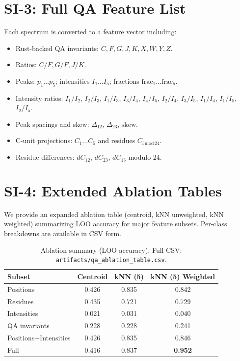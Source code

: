 \documentclass[12pt]{article}
\begin{document}
\section*{SI-3: Full QA Feature List}
Each spectrum is converted to a feature vector including:
\begin{itemize}
  \item Rust-backed QA invariants: $C,F,G,J,K,X,W,Y,Z$.
  \item Ratios: $C/F, G/F, J/K$.
  \item Peaks: $p_1\ldots p_5$; intensities $I_1\ldots I_5$; fractions $\mathrm{frac}_1\ldots\mathrm{frac}_5$.
  \item Intensity ratios: $I_1/I_2$, $I_2/I_3$, $I_1/I_3$, $I_3/I_4$, $I_4/I_5$, $I_2/I_4$, $I_3/I_5$, $I_1/I_4$, $I_1/I_5$, $I_2/I_5$.
  \item Peak spacings and skew: $\Delta_{12}$, $\Delta_{23}$, $\mathrm{skew}$.
  \item C-unit projections: $C_1\ldots C_5$ and residues $C_{i\,\mathrm{mod}\,24}$.
  \item Residue differences: $dC_{12}$, $dC_{23}$, $dC_{13}$ modulo 24.
\end{itemize}

\section*{SI-4: Extended Ablation Tables}
We provide an expanded ablation table (centroid, kNN unweighted, kNN weighted) summarizing LOO accuracy for major feature subsets. Per-class breakdowns are available in CSV form.

\begin{table}[H]
\centering
\caption{Ablation summary (LOO accuracy). Full CSV: \texttt{artifacts/qa\_ablation\_table.csv}.}
\begin{tabular}{lccc}
\toprule
Subset & Centroid & kNN (5) & kNN (5) Weighted \\
\midrule
Positions & 0.426 & 0.835 & 0.842 \\
Residues & 0.435 & 0.721 & 0.729 \\
Intensities & 0.021 & 0.031 & 0.040 \\
QA invariants & 0.228 & 0.228 & 0.241 \\
Positions+Intensities & 0.426 & 0.835 & 0.846 \\
Full & 0.416 & 0.837 & \textbf{0.952} \\
\bottomrule
\end{tabular}
\end{table}
\end{document}
